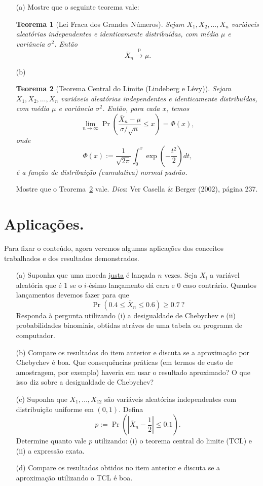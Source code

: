 \documentclass[a4paper,12pt, notitlepage]{paper}
\newtheorem{theo}{Teorema}
\newcommand{\pr}{\operatorname{Pr}} %
\newcommand{\rs}{X_1, X_2, \ldots, X_n} %
\begin{document}
 \begin{itemize}
 \item[(a)] Mostre que o seguinte teorema vale:
 \begin{theo}[Lei Fraca dos Grandes Números]
\label{thm:WLLN}
Sejam  $\rs$ variáveis aleatórias independentes e identicamente distribuídas, com média $\mu$ e variância $\sigma^2$.
 Então
 $$ \bar{X}_n \xrightarrow{\text{p}} \mu.$$
\end{theo}
 \item[(b)] \begin{theo}[Teorema Central do Limite (Lindeberg e Lévy)]
 \label{thm:CLT_LindebergLevy}
Sejam  $\rs$ variáveis aleatórias independentes e identicamente distribuídas, com média $\mu$ e variância $\sigma^2$.
Então, para cada $x$, temos
$$ \lim_{n\to\infty} \pr\left( \frac{\bar{X}_n - \mu}{\sigma/\sqrt{n}} \leq x \right) = \Phi(x), $$
onde 
$$\Phi(x) := \frac{1}{\sqrt{2\pi}}\int_0^x \exp\left(-\frac{t^2}{2}\right)dt,$$
é a função de distribuição (cumulativa) normal padrão.
\end{theo}
Mostre que o Teorema~\ref{thm:CLT_LindebergLevy} vale.
\textit{Dica}: Ver Casella \& Berger (2002), página 237.
\end{itemize}

\section{Aplicações.}

Para fixar o conteúdo, agora veremos algumas aplicações dos conceitos trabalhados e dos resultados demonstrados.

\begin{itemize}
 \item[(a)] Suponha  que uma moeda \underline{justa} é lançada $n$ vezes.
Seja $X_i$ a variável aleatória que é $1$ se o $i$-ésimo lançamento dá cara e $0$ caso contrário.
Quantos lançamentos devemos fazer para que 
$$ \pr(0.4 \leq \bar{X}_n \leq 0.6) \geq 0.7\: ?$$
Responda à pergunta utilizando (i) a desigualdade de Chebychev e (ii) probabilidades binomiais, obtidas atráves de uma tabela ou programa de computador.
 \item[(b)] Compare os resultados do item anterior e discuta se a aproximação por Chebychev é boa. 
 Que consequências práticas (em termos de custo de amostragem, por exemplo) haveria em usar o resultado aproximado? 
 O que isso diz sobre a desigualdade de Chebychev?
 \item[(c)] Suponha que $X_1, \ldots, X_{12}$ são variáveis aleatórias independentes com distribuição uniforme em $(0, 1)$.
Defina
$$  p:=  \pr\left(\left| \bar{X}_n - \frac{1}{2}\right| \leq 0.1\right).$$
Determine quanto vale $p$ utilizando: (i) o teorema central do limite (TCL) e (ii) a expressão exata.
 \item[(d)] Compare os resultados obtidos no item anterior e discuta se a aproximação utilizando o TCL é boa.
\end{itemize}
 
\end{document}
